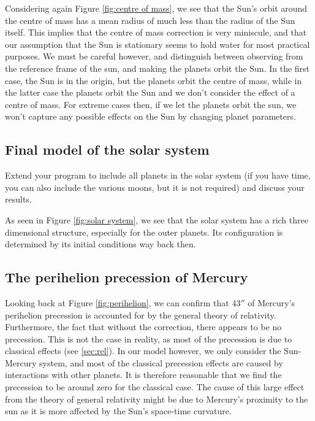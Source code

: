 Considering again Figure \ref{fig:centre of mass}, we see that the Sun's orbit around
the centre of mass has a mean radius of much less than the radius of the Sun itself.
This implies that the centre of mass correction is very miniscule, and that our assumption
that the Sun is stationary seems to hold water for most practical purposes. We must be careful however, and distinguish between observing from the reference frame of the sun, and making the planets orbit the Sun. In the first case, the Sun is in the origin, but the planets orbit the centre of mass, while in the latter case the planets orbit the Sun and we don't consider the effect of a centre of mass. For extreme cases then, if we let the planets orbit the sun, we won't capture any possible effects on the Sun by changing planet parameters.

\subsection{Final model of the solar system}
Extend your program to include all planets in the solar system (if you
have time, you can also include the various moons, but it is not required) and
discuss your results.

As seen in Figure \ref{fig:solar system}, we see that the solar system has a rich
three dimensional structure, especially for the outer planets. Its configuration is determined by its
initial conditions way back then.


\subsection{The perihelion precession of Mercury}
Looking back at Figure \ref{fig:perihelion}, we can confirm that $43''$ of Mercury's perihelion
precession is accounted for by the general theory of relativity. Furthermore, the fact that without the correction, there
appears to be no precession. This is not the case in reality, as most of the precession is due to classical effects (see \ref{sec:rel}). In our model however, we only consider the Sun-Mercury system, and most of the classical precession effects are caused by interactions with other planets. It is therefore reasonable that we find the precession to be around zero for the classical case. The cause of this large effect from the theory of general relativity might be due to Mercury's proximity to the sun as it is more affected by the Sun's space-time curvature.
